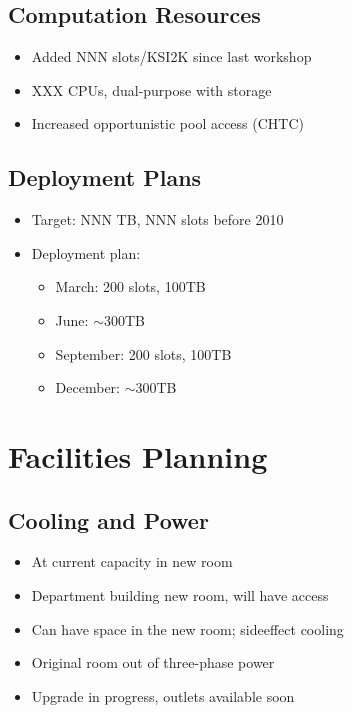 \documentclass{beamer}
\newcommand{\ca}{\ensuremath{\sim}}
\begin{document}
\subsection{Computation Resources}
\begin{frame}
\begin{itemize}
    \item Added NNN slots/KSI2K since last workshop
    \item XXX CPUs, dual-purpose with storage
    \item Increased opportunistic pool access (CHTC)
\end{itemize}
\end{frame}

\subsection{Deployment Plans}
\begin{frame}
\begin{itemize}
    \item Target: NNN TB, NNN slots before 2010
    \item Deployment plan:
    \begin{itemize}
        \item March: 200 slots, 100TB
        \item June: \ca{}300TB
        \item September: 200 slots, 100TB
        \item December: \ca{}300TB
    \end{itemize}
\end{itemize}
\end{frame}

\section{Facilities Planning}
\subsection{Cooling and Power}
\begin{frame}
\begin{itemize}
    \item At current capacity in new room
    \item Department building new room, will have access
    \item Can have space in the new room; sideeffect cooling
    \item Original room out of three-phase power
    \item Upgrade in progress, outlets available soon
\end{itemize}
\end{frame}
\end{document}
